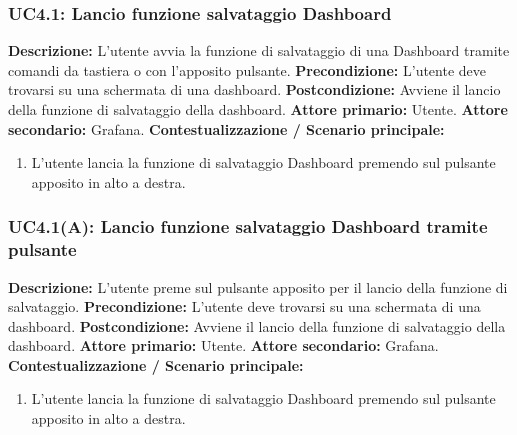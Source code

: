                 \subsubsection{UC4.1: Lancio funzione salvataggio Dashboard}
                    \textbf{Descrizione:} L’utente avvia la funzione di salvataggio di una Dashboard tramite comandi da tastiera o con l'apposito pulsante.
                    \newline
                    \textbf{Precondizione:} L'utente deve trovarsi su una schermata di una dashboard.
                    \newline
                    \textbf{Postcondizione:} Avviene il lancio della funzione di salvataggio della dashboard.
                    \newline
                    \textbf{Attore primario:} Utente.
                    \newline
                    \textbf{Attore secondario:} Grafana.
                    \newline
                    \textbf{Contestualizzazione / Scenario principale:} \begin{enumerate}
                        \item L'utente lancia la funzione di salvataggio Dashboard premendo sul pulsante apposito in alto a destra.
                    \end{enumerate}
                
                \subsubsection{UC4.1(A): Lancio funzione salvataggio Dashboard tramite pulsante}
                    \textbf{Descrizione:} L’utente preme sul pulsante apposito per il lancio della funzione di salvataggio.
                    \newline
                    \textbf{Precondizione:} L'utente deve trovarsi su una schermata di una dashboard.
                    \newline
                    \textbf{Postcondizione:} Avviene il lancio della funzione di salvataggio della dashboard.
                    \newline
                    \textbf{Attore primario:} Utente.
                    \newline
                    \textbf{Attore secondario:} Grafana.
                    \newline
                    \textbf{Contestualizzazione / Scenario principale:} \begin{enumerate}
                        \item L'utente lancia la funzione di salvataggio Dashboard premendo sul pulsante apposito in alto a destra.
                    \end{enumerate}
                
